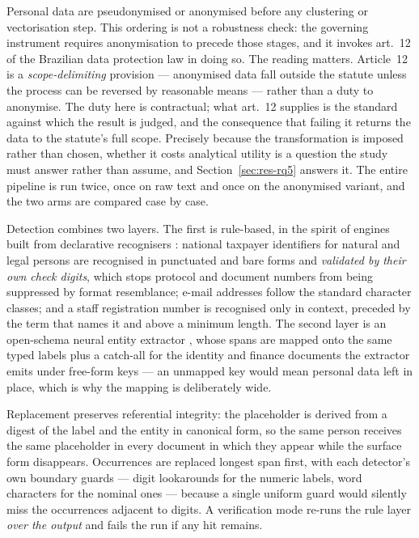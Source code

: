 Personal data are pseudonymised or anonymised before any clustering or vectorisation step. This
ordering is not a robustness check: the governing instrument requires anonymisation to precede
those stages, and it invokes art.~12 of the Brazilian data protection law
\citep{brasil2018lgpd} in doing so. The reading matters. Article~12 is a
\emph{scope-delimiting} provision --- anonymised data fall outside the statute unless the
process can be reversed by reasonable means --- rather than a duty to anonymise. The duty here
is contractual; what art.~12 supplies is the standard against which the result is judged, and
the consequence that failing it returns the data to the statute's full scope. Precisely because
the transformation is imposed rather than chosen, whether it costs analytical utility is a
question the study must answer rather than assume, and Section~\ref{sec:res-rq5} answers it. The
entire pipeline is run twice, once on raw text and once on the anonymised variant, and the two
arms are compared case by case.

Detection combines two layers. The first is rule-based, in the spirit of engines built from
declarative recognisers \citep{microsoftpresidio}: national taxpayer identifiers for natural and
legal persons are recognised in punctuated and bare forms and \emph{validated by their own check
digits}, which stops protocol and document numbers from being suppressed by format resemblance;
e-mail addresses follow the standard character classes; and a staff registration number is
recognised only in context, preceded by the term that names it and above a minimum length. The
second layer is an open-schema neural entity extractor \citep{zaratiana2025gliner2}, whose spans
are mapped onto the same typed labels plus a catch-all for the identity and finance documents
the extractor emits under free-form keys --- an unmapped key would mean personal data left in
place, which is why the mapping is deliberately wide.

Replacement preserves referential integrity: the placeholder is derived from a digest of the
label and the entity in canonical form, so the same person receives the same placeholder in
every document in which they appear while the surface form disappears. Occurrences are replaced
longest span first, with each detector's own boundary guards --- digit lookarounds for the
numeric labels, word characters for the nominal ones --- because a single uniform guard would
silently miss the occurrences adjacent to digits. A verification mode re-runs the rule layer
\emph{over the output} and fails the run if any hit remains.

